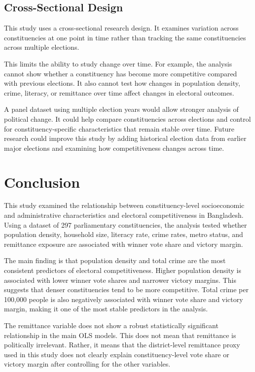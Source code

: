 \documentclass[12pt,a4paper]{article}
\begin{document}
\subsection{Cross-Sectional Design}

This study uses a cross-sectional research design. It examines variation across constituencies at one point in time rather than tracking the same constituencies across multiple elections.

This limits the ability to study change over time. For example, the analysis cannot show whether a constituency has become more competitive compared with previous elections. It also cannot test how changes in population density, crime, literacy, or remittance over time affect changes in electoral outcomes.

A panel dataset using multiple election years would allow stronger analysis of political change. It could help compare constituencies across elections and control for constituency-specific characteristics that remain stable over time. Future research could improve this study by adding historical election data from earlier major elections and examining how competitiveness changes across time.

\section{Conclusion}

This study examined the relationship between constituency-level socioeconomic and administrative characteristics and electoral competitiveness in Bangladesh. Using a dataset of 297 parliamentary constituencies, the analysis tested whether population density, household size, literacy rate, crime rates, metro status, and remittance exposure are associated with winner vote share and victory margin.

The main finding is that population density and total crime are the most consistent predictors of electoral competitiveness. Higher population density is associated with lower winner vote shares and narrower victory margins. This suggests that denser constituencies tend to be more competitive. Total crime per 100,000 people is also negatively associated with winner vote share and victory margin, making it one of the most stable predictors in the analysis.

The remittance variable does not show a robust statistically significant relationship in the main OLS models. This does not mean that remittance is politically irrelevant. Rather, it means that the district-level remittance proxy used in this study does not clearly explain constituency-level vote share or victory margin after controlling for the other variables.
\end{document}
